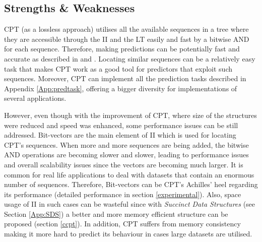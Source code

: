 \subsection{Strengths \& Weaknesses}

CPT (as a lossless approach) utilises all the available sequences in a tree where they are accessible through the II and the LT easily and fast by a bitwise AND for each sequence. Therefore, making predictions can be potentially fast and accurate as described in \citep{gueniche_fournier-viger_tseng_2013} and \citep{gueniche_fournier-viger_raman_tseng_2015}. Locating similar sequences can be a relatively easy task that makes CPT work as a good tool for predictors that exploit such sequences. Moreover, CPT can implement all the prediction tasks described in Appendix \ref{App:predtask}, offering a bigger diversity for implementations of several applications. 
\par However, even though with the improvement of CPT, where size of the structures were reduced and speed was enhanced, some performance issues can be still addressed. Bit-vectors are the main element of II which is used for locating CPT's sequences. When more and more sequences are being added, the bitwise AND operations are becoming slower and slower, leading to performance issues and overall scalability issues since the vectors are becoming much larger. It is common for real life applications to deal with datasets that contain an enormous number of sequences. Therefore, Bit-vectors can be CPT's Achilles' heel regarding its performance (detailed performance in section \ref{experimental}). Also, space usage of II in such cases can be wasteful since with \emph{Succinct Data Structures} (see Section \ref{App:SDS}) a better and more memory efficient structure can be proposed (section \ref{ccpt}). In addition,  CPT suffers from memory consistency making it more hard to predict its behaviour in cases large datasets are utilised.
